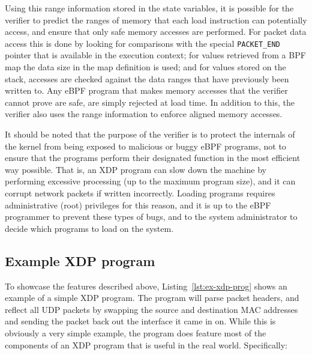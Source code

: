 \documentclass[sigconf]{acmart}
\begin{document}
Using this range information stored in the state variables, it is possible for
the verifier to predict the ranges of memory that each load instruction can
potentially access, and ensure that only safe memory accesses are performed. For
packet data access this is done by looking for comparisons with the special
\texttt{PACKET\_END} pointer that is available in the execution context; for
values retrieved from a BPF map the data size in the map definition is used; and
for values stored on the stack, accesses are checked against the data ranges
that have previously been written to. Any eBPF program that makes memory
accesses that the verifier cannot prove are safe, are simply rejected at load
time. In addition to this, the verifier also uses the range information to
enforce aligned memory accesses.

It should be noted that the purpose of the verifier is to protect the internals
of the kernel from being exposed to malicious or buggy eBPF programs, not to
ensure that the programs perform their designated function in the most efficient
way possible. That is, an XDP program can slow down the machine by performing
excessive processing (up to the maximum program size), and it can corrupt
network packets if written incorrectly. Loading programs requires administrative
(root) privileges for this reason, and it is up to the eBPF programmer to
prevent these types of bugs, and to the system administrator to decide which
programs to load on the system.


\subsection{Example XDP program}
\label{sec:example-xdp-program}


To showcase the features described above, Listing~\ref{lst:ex-xdp-prog} shows an
example of a simple XDP program. The program will parse packet headers, and
reflect all UDP packets by swapping the source and destination MAC addresses and
sending the packet back out the interface it came in on. While this is obviously
a very simple example, the program does feature most of the components of an XDP
program that is useful in the real world. Specifically:
\end{document}
